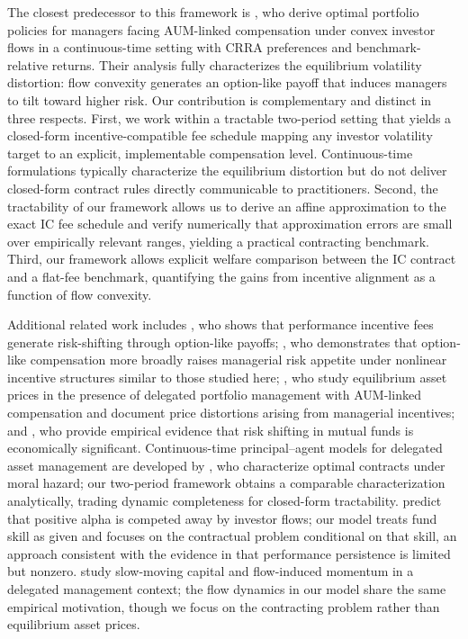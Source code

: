 The closest predecessor to this framework is \citet{basak2007optimal},
who derive optimal portfolio policies for managers facing AUM-linked
compensation under convex investor flows in a continuous-time setting
with CRRA preferences and benchmark-relative returns. Their analysis
fully characterizes the equilibrium volatility distortion: flow
convexity generates an option-like payoff that induces managers to tilt
toward higher risk. Our contribution is complementary and distinct in
three respects. First, we work within a tractable two-period setting
that yields a closed-form incentive-compatible fee schedule mapping any
investor volatility target to an explicit, implementable compensation
level. Continuous-time formulations typically characterize the
equilibrium distortion but do not deliver closed-form contract rules
directly communicable to practitioners. Second, the tractability of our
framework allows us to derive an affine approximation to the exact IC
fee schedule and verify numerically that approximation errors are small
over empirically relevant ranges, yielding a practical contracting
benchmark. Third, our framework allows explicit welfare comparison
between the IC contract and a flat-fee benchmark, quantifying the gains
from incentive alignment as a function of flow convexity.

Additional related work includes \citet{Starks1987}, who shows that
performance incentive fees generate risk-shifting through option-like
payoffs; \citet{Carpenter2000}, who demonstrates that option-like
compensation more broadly raises managerial risk appetite under
nonlinear incentive structures similar to those studied here;
\citet{CuocoKaniel2011}, who study equilibrium asset prices in the
presence of delegated portfolio management with AUM-linked compensation
and document price distortions arising from managerial incentives; and
\citet{HuangSialmZhang2011}, who provide empirical evidence that risk
shifting in mutual funds is economically significant. Continuous-time
principal--agent models for delegated asset management are developed by
\citet{OuYang2003}, who characterize optimal contracts under moral
hazard; our two-period framework obtains a comparable characterization
analytically, trading dynamic completeness for closed-form tractability.
\citet{berk2004mutual} predict that positive alpha is competed away by
investor flows; our model treats fund skill as given and focuses on the
contractual problem conditional on that skill, an approach consistent
with the evidence in \citet{carhart1997persistence} that performance
persistence is limited but nonzero. \citet{VayanosWoolley2013} study
slow-moving capital and flow-induced momentum in a delegated management
context; the flow dynamics in our model share the same empirical
motivation, though we focus on the contracting problem rather than
equilibrium asset prices.

